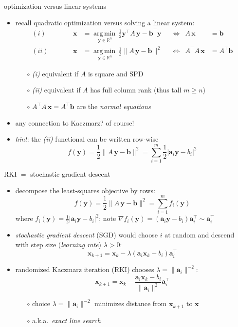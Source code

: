 \documentclass[usepdftitle=false,usenames,dvipsnames]{beamer}
\newcommand{\RR}{\mathbb{R}}
\newcommand{\grad}{\nabla}
\newcommand{\argmin}[1]{\underset{#1}{\operatorname{arg\, min}\,}}
\newcommand{\ba}{\mathbf{a}}
\newcommand{\bb}{\mathbf{b}}
\newcommand{\bx}{\mathbf{x}}
\newcommand{\by}{\mathbf{y}}
\begin{document}
\begin{frame}{optimization versus linear systems}

\begin{itemize}
\item recall quadratic optimization versus solving a linear system:
\begin{align*}
(i)\qquad && \bx &= \argmin{\by \in \RR^n} \frac{1}{2} \by^\top A\, \by - \bb^\top \by &&\iff & A\,\bx&=\bb \\
(ii)\qquad && \bx &= \argmin{\by \in \RR^n} \frac{1}{2} \|A\, \by - \bb\|^2 &&\iff & A^\top A\,\bx&=A^\top\bb
\end{align*}

    \begin{itemize}
    \item[$\circ$] \emph{(i)} equivalent if $A$ is square and SPD
    \item[$\circ$] \emph{(ii)} equivalent if $A$ has full column rank (thus tall $m\ge n$)
    \item[$\circ$] $A^\top A\,\bx=A^\top\bb$ are the \emph{normal equations}
    \end{itemize}
\item any connection to Kaczmarz?  of course!
\item \emph{hint}: the \emph{(ii)}  functional can be written row-wise
	$$f(\by) = \frac{1}{2} \|A\, \by - \bb\|^2 = \sum_{i=1}^m \frac{1}{2} |\ba_i \by - b_i|^2$$
\end{itemize}
\end{frame}


\begin{frame}{RKI $=$ stochastic gradient descent}

\begin{itemize}
\item decompose the least-squares objective by rows:
    $$f(\by) = \frac{1}{2} \|A\, \by - \bb\|^2 = \sum_{i=1}^m f_i(\by)$$
where $f_i(\by) = \frac{1}{2} |\ba_i \by - b_i|^2$; note $\grad f_i(\by) = (\ba_i \by - b_i) \ba_i^\top \sim \ba_i^\top$
\item \emph{stochastic gradient descent} (SGD) would choose $i$ at random and descend with step size (\emph{learning rate}) $\lambda>0$:
    $$\bx_{k+1} = \bx_k - \lambda (\ba_i \bx_k - b_i) \ba_i^\top$$
\item randomized Kaczmarz iteration (RKI) chooses $\lambda = \|\ba_i\|^{-2}$:
    $$\bx_{k+1} = \bx_k - \frac{\ba_i \bx_k - b_i}{\|\ba_i\|^2} \ba_i^\top$$
    \begin{itemize}
    \item[$\circ$] choice $\lambda = \|\ba_i\|^{-2}$ minimizes distance from $\bx_{k+1}$ to $\bx$
    \item[$\circ$] a.k.a.~\emph{exact line search}
    \end{itemize}
\end{itemize}
\end{frame}
\end{document}

